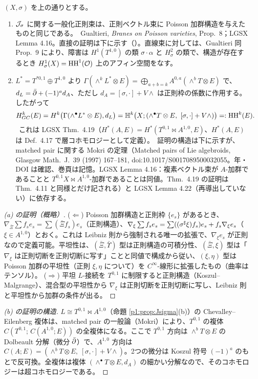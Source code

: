 \begin{prop}[一般化正則束 $=$ Poisson 加群、および Dolbeault モデル]\label{p1:prop:ident}
$(X,\sigma)$ を上の通りとする。
\begin{enumerate}
\item[(a)] $\mathcal J_\sigma$ に関する一般化正則束は、正則ベクトル束に Poisson 加群構造を与えたものと同じである。\tC\ Gualtieri, \emph{Branes on Poisson varieties}, Prop.\ 8；LGSX Lemma 4.16。直接の証明は下に示す（\tP）。直線束に対しては、Gualtieri 同 Prop.\ 9 により、障害は $H^1(T^{1,0})$ の類 $\sigma\cdot\alpha$ と $H^2_\sigma$ の類で、構造が存在するとき $H^1_\sigma(X)=\mathrm{HH}^1(\mathcal O)$ 上のアフィン空間をなす。\tC
\item[(b)] $L^*=T^{*0,1}\oplus T^{1,0}$ より $\Gamma(\wedge^kL^*\otimes E)=\bigoplus_{a+b=k}A^{0,a}(\wedge^bT\otimes E)$ で、$d_L=\bar\partial+(-1)^ad_A$、ただし $d_A=[\sigma,\cdot]+V\wedge$ は正則枠の係数に作用する。したがって
\[H^k_{GC}(E)=H^k\bigl(\Gamma(\wedge^\bullet L^*\otimes E),d_L\bigr)=\mathbb H^k\bigl(X;(\wedge^\bullet T\otimes E,\ [\sigma,\cdot]+V\wedge)\bigr)=:\HH^k(E).\]
\tC\ これは LGSX Thm.\ 4.19（$H^*(A,E)=H^*(T^{0,1}\bowtie A^{1,0},E)$、$H^*(A,E)$ は Def.\ 4.17 で層コホモロジーとして定義）。\tP\ 証明の構造は下に示すが、matched pair に関する Mokri の定理（Matched pairs of Lie algebroids, Glasgow Math.\ J.\ 39 (1997) 167--181, doi:10.1017/S0017089500032055。年・DOI は確認、巻頁は記憶\tQ。LGSX Lemma 4.16：複素ベクトル束が $A$-加群であることと $T^{0,1}X\bowtie A^{1,0}$-加群であることは同値。Thm.\ 4.19 の証明は Thm.\ 4.11 と同様とだけ記される）と LGSX Lemma 4.22（再導出していない）に依存する。
\end{enumerate}
\end{prop}
\begin{proof}[(a) の証明（概略）]
($\Leftarrow$) Poisson 加群構造と正則枠 $\{e_s\}$ があるとき、$\nabla_{\bar\Xi}\sum f_se_s=\sum(\bar\Xi f_s)e_s$（正則構造）、$\nabla_\xi\sum f_se_s=\sum((\sigma^\sharp\xi)f_s)e_s+f_s\nabla_\xi e_s$（$\xi\in A^{1,0}$）とおく。これは Leibniz 則から強制される唯一の拡張で、$\nabla_\xi e_s$ が正則なので定義可能。平坦性は、$(\bar\Xi,\bar\Upsilon)$ 型は正則構造の可積分性、$(\bar\Xi,\xi)$ 型は「$\nabla_\xi$ は正則切断を正則切断に写す」ことと同値で構成から従い、$(\xi,\eta)$ 型は Poisson 加群の平坦性（正則 $\xi,\eta$ について）を $C^\infty$-線形に拡張したもの（曲率はテンソル）。
($\Rightarrow$) 平坦 $L$-接続を $T^{0,1}$ に制限すると正則構造（Koszul--Malgrange）、混合型の平坦性から $\nabla_\xi$ は正則切断を正則切断に写し、Leibniz 則と平坦性から加群の条件が出る。\qedhere
\end{proof}
\begin{proof}[(b) の証明の構造]
$L\cong T^{0,1}\bowtie A^{1,0}$（命題 \ref{p1:prop:Jsigma}(b)）の Chevalley--Eilenberg 複体は、matched pair の一般論（Mokri）により、$T^{0,1}$ の複体 $C(T^{0,1};\,C(A^{1,0};E))$ の全複体になる。ここで $T^{0,1}$ 方向は $\wedge^bT\otimes E$ の Dolbeault 分解（微分 $\bar\partial$）で、$A^{1,0}$ 方向は $C(A;E)=(\wedge^bT\otimes E,\ [\sigma,\cdot]+V\wedge)$。2つの微分は Koszul 符号 $(-1)^a$ のもとで反可換。全複体は複体 $(\wedge^\bullet T\otimes E,d_A)$ の細かい分解なので、そのコホモロジーは超コホモロジーである。\qedhere
\end{proof}

